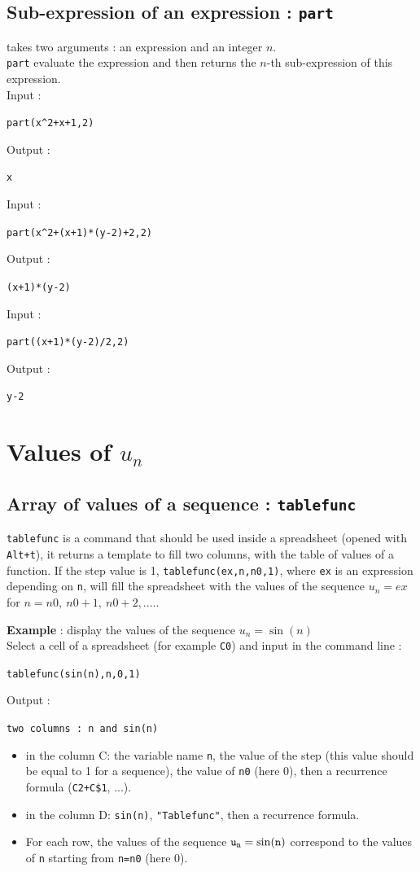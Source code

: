 \documentclass[a4paper,11pt]{book}
\begin{document}
\subsection{Sub-expression of an expression : {\tt part}}
 takes two arguments : an expression and an integer $n$.\\
{\tt part} evaluate the expression and then returns the $n$-th sub-expression
of this expression.\\
Input :
\begin{center}{\tt part(x\verb|^|2+x+1,2)}\end{center}
Output :
\begin{center}{\tt x}\end{center}
Input :
\begin{center}{\tt part(x\verb|^|2+(x+1)*(y-2)+2,2)}\end{center}
Output :
\begin{center}{\tt (x+1)*(y-2)}\end{center}
Input :
\begin{center}{\tt part((x+1)*(y-2)/2,2)}\end{center}
Output :
\begin{center}{\tt y-2}\end{center}

\section{Values of $u_n$}
\subsection{Array of values of a sequence : {\tt tablefunc}}
{\tt tablefunc} is a command that should be used inside a spreadsheet
(opened with {\tt Alt+t}),
it returns a template to fill two columns, with
the table of values of a function. If the step value is 1,
{\tt tablefunc(ex,n,n0,1)}, where {\tt ex} is an expression
depending on {\tt n}, will fill the spreadsheet with
the values of the sequence $u_n=ex$ for $n=n0,\ n0+1,\ n0+2,....$.

{\bf Example} : display the values of the sequence $u_n=\sin(n)$\\
Select a cell of a spreadsheet (for example {\tt C0}) 
and input in the command line : 
\begin{center}{\tt tablefunc(sin(n),n,0,1)}\end{center}
Output :
\begin{center}{\tt two columns : {\tt n} and {\tt sin(n)}}\end{center}
\begin{itemize}
\item in the column C: the variable name {\tt n}, the value of the step 
(this value should be equal to 1 for a sequence),
the value of {\tt n0} (here 0), then a recurrence 
formula ({\tt C2+C\$1}, ...). 
\item  in the column D: {\tt sin(n)}, {\tt "Tablefunc"}, then a 
recurrence formula.
\item For each row,
the values of the sequence ${\tt u_n=\sin(n)}$ correspond to 
the values of {\tt n} starting from {\tt n=n0} (here 0).
\end{itemize} 
\end{document}
